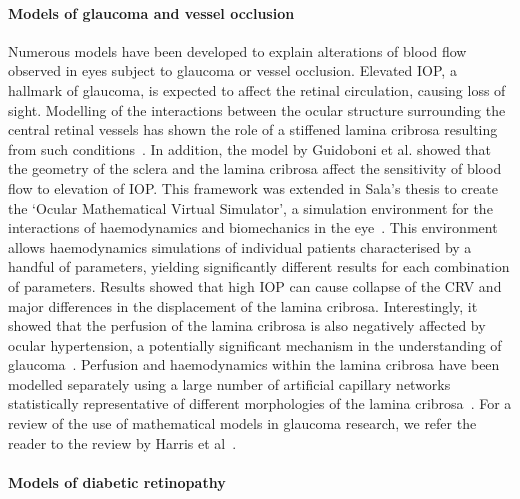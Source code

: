 \documentclass{article}
\begin{document}
\paragraph*{Models of glaucoma and vessel occlusion}

Numerous models have been developed to explain alterations of blood flow observed in eyes subject to glaucoma or vessel occlusion\cite{Chuangsuwanich_2016,Guidoboni_2014,Sala_2018,Sala_2020}.
Elevated IOP, a hallmark of glaucoma, is expected to affect the retinal circulation, causing loss of sight.
Modelling of the interactions between the ocular structure surrounding the central retinal vessels has shown the role of a stiffened lamina cribrosa resulting from such conditions~\cite{Guidoboni_2014}.
In addition, the model by Guidoboni et al. showed that the geometry of the sclera and the lamina cribrosa affect the sensitivity of blood flow to elevation of IOP.
This framework was extended in Sala's thesis to create the `Ocular Mathematical Virtual Simulator', a simulation environment for the interactions of haemodynamics and biomechanics in the eye~\cite{Sala_2018,Sala_2020}.
This environment allows haemodynamics simulations of individual patients characterised by a handful of parameters, yielding significantly different results for each combination of parameters.
Results showed that high IOP can cause collapse of the CRV and major differences in the displacement of the lamina cribrosa.
Interestingly, it showed that the perfusion of the lamina cribrosa is also negatively affected by ocular hypertension, a potentially significant mechanism in the understanding of glaucoma~\cite{Sala_2020}.
Perfusion and haemodynamics within the lamina cribrosa have been modelled separately using a large number of artificial capillary networks statistically representative of different morphologies of the lamina cribrosa~\cite{Chuangsuwanich_2016}.
For a review of the use of mathematical models in glaucoma research, we refer the reader to the review by Harris et al~\cite{Harris_2013}.

\paragraph*{Models of diabetic retinopathy}
\end{document}
